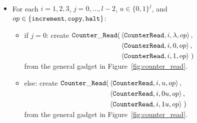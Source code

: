 \subsubsection{\cread}

\begin{itemize}
\item For each $i = 1,2,3$,
               $j = 0,\ldots,l-2$,
               $u \in \{0, 1\}^j$, and
               $op \in \{ {\tt increment}, {\tt copy}, {\tt halt} \}$:
    \begin{itemize}
        \item if $j = 0$:
        create
        $\begin{aligned}[t]
            {\tt Counter\_Read}(& \left\langle {\tt CounterRead}, i, \lambda, op \right\rangle, \\
                   & \left\langle {\tt CounterRead}, i, 0,       op \right\rangle, \\
                   & \left\langle {\tt CounterRead}, i, 1,       op \right\rangle \;)
        \end{aligned}$\\ from the general gadget in Figure~\ref{fig:counter_read}.

        \item else:
        create $\begin{aligned}[t]
        {\tt Counter\_Read}(& \left\langle {\tt CounterRead}, i, u,  op \right\rangle, \\
               & \left\langle {\tt CounterRead}, i, 0u, op \right\rangle, \\
               & \left\langle {\tt CounterRead}, i, 1u, op \right\rangle \;)
        \end{aligned}$\\ from the general gadget in Figure~\ref{fig:counter_read}.
    \end{itemize}

\end{itemize}

